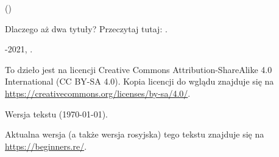 ﻿\begin{titlepage}


\end{titlepage}

\newpage

\begin{center}
\vspace*{\fill}
{\LARGE \TitleMain}

\bigskip

{\large (\TitleAux)}

\bigskip
\bigskip
Dlaczego aż dwa tytuły? Przeczytaj tutaj: .

\vspace*{\fill}

{\large \AUTHOR}

{\large \TT{\EMAILPRI}}
\vspace*{\fill}
\vfill

\ccbysa

-2021, \AUTHOR. 

To dzieło jest na licencji Creative Commons Attribution-ShareAlike 4.0 International (CC BY-SA 4.0).
Kopia licencji do wglądu znajduje się na \url{https://creativecommons.org/licenses/by-sa/4.0/}.

Wersja tekstu ({\large \today}).

Aktualna wersja (a także wersja rosyjska) tego tekstu znajduje się na \url{https://beginners.re/}.

\end{center}
